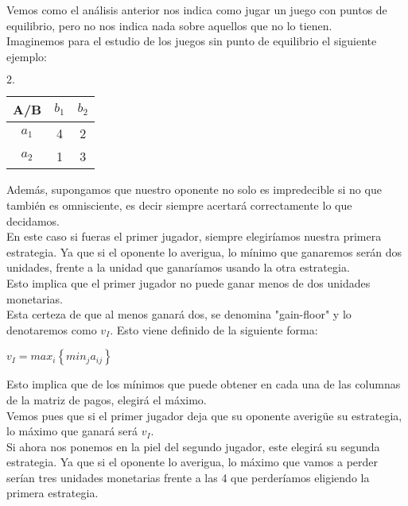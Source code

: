 \documentclass[10pt,a4paper]{book}
\begin{document}
Vemos como el análisis anterior nos indica como jugar un juego con puntos de equilibrio, pero no nos indica nada sobre aquellos que no lo tienen.\\

Imaginemos para el estudio de los juegos sin punto de equilibrio el siguiente ejemplo:\\


\begin{center}
		$2. \quad$
	\begin{tabular}{|c|c|c|}
		\hline
		A/B & $b_1$ & $b_2$ \\
		\hline
		$a_1$ & 4 & 2 \\
		\hline
		$a_2$ & 1 & 3 \\
		\hline
	\end{tabular}
\end{center}

Además, supongamos que nuestro oponente no solo es impredecible si no que también es omnisciente, es decir siempre acertará correctamente lo que decidamos.\\

En este caso si fueras el primer jugador, siempre elegiríamos nuestra primera estrategia. Ya que si el oponente lo averigua, lo mínimo que ganaremos serán dos unidades, frente a la unidad que ganaríamos usando la otra estrategia.\\

Esto implica que el primer jugador no puede ganar menos de dos unidades monetarias.\\

Esta certeza de que al menos ganará dos, se denomina "gain-floor" y lo denotaremos como $v_I$. Esto viene definido de la siguiente forma:\\

\begin{center}

$v_I=max_i\left\lbrace min_j a_{ij} \right\rbrace $

\end{center}

Esto implica que de los mínimos que puede obtener en cada una de las columnas de la matriz de pagos, elegirá el máximo.\\

Vemos pues que si el primer jugador deja que su oponente averigüe su estrategia, lo máximo que ganará será $v_I$.\\

Si ahora nos ponemos en la piel del segundo jugador, este elegirá su segunda estrategia. Ya que si el oponente lo averigua, lo máximo que vamos a perder serían tres unidades monetarias frente a las 4 que perderíamos eligiendo la primera estrategia.\\
\end{document}
